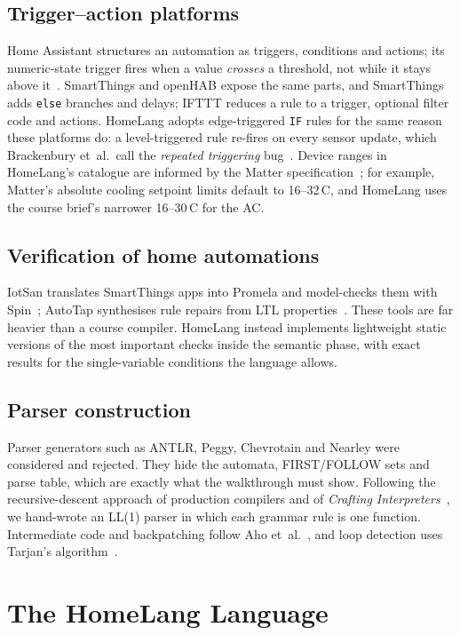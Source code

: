 \documentclass[conference]{IEEEtran}
\newcommand{\code}[1]{\texttt{#1}}
\newcommand{\degC}{\textdegree{}C}
\begin{document}
\subsection{Trigger--action platforms}
Home Assistant structures an automation as triggers, conditions and actions; its numeric-state trigger fires when a value \emph{crosses} a threshold, not while it stays above it~\cite{homeassistant}. SmartThings and openHAB expose the same parts, and SmartThings adds \code{else} branches and delays; IFTTT reduces a rule to a trigger, optional filter code and actions. HomeLang adopts edge-triggered \code{IF} rules for the same reason these platforms do: a level-triggered rule re-fires on every sensor update, which Brackenbury et~al.\ call the \emph{repeated triggering} bug~\cite{brackenbury2019}. Device ranges in HomeLang's catalogue are informed by the Matter specification~\cite{matter}; for example, Matter's absolute cooling setpoint limits default to 16--32\,\degC, and HomeLang uses the course brief's narrower 16--30\,\degC{} for the AC.

\subsection{Verification of home automations}
IotSan translates SmartThings apps into Promela and model-checks them with Spin~\cite{iotsan}; AutoTap synthesises rule repairs from LTL properties~\cite{autotap}. These tools are far heavier than a course compiler. HomeLang instead implements lightweight static versions of the most important checks inside the semantic phase, with exact results for the single-variable conditions the language allows.

\subsection{Parser construction}
Parser generators such as ANTLR, Peggy, Chevrotain and Nearley were considered and rejected. They hide the automata, FIRST/FOLLOW sets and parse table, which are exactly what the walkthrough must show. Following the recursive-descent approach of production compilers and of \emph{Crafting Interpreters}~\cite{nystrom}, we hand-wrote an LL(1) parser in which each grammar rule is one function. Intermediate code and backpatching follow Aho et~al.~\cite{dragon}, and loop detection uses Tarjan's algorithm~\cite{tarjan}.

\section{The HomeLang Language}\label{sec:lang}
\end{document}
